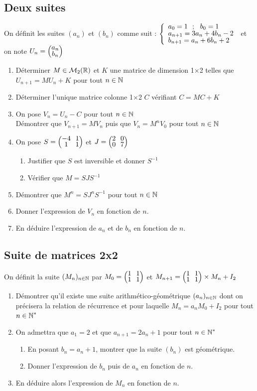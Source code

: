 \documentclass[oneside,12pt]{book}          %
\begin{document}
\subsection{Deux suites}
On définit les suites $(a_n)$ et $(b_n)$ comme suit : $\accol{a_0=1 ~~ ; ~~ b_0=1\\a_{n+1}=3a_n+4b_n-2\\b_{n+1}=a_n+6b_n+2}$ et on note $U_n=\matrice{a_n\\b_n}$

\begin{enumerate}
	\item Déterminer $M\in\mathcal{M}_2({\mathbb R})$ et $K$ une matrice de dimension 1$\times$2 telles que $U_{n+1}=MU_n+K$ pour tout ${n\in\mathbb N}$
	\item Déterminer l'unique matrice colonne 1$\times$2 $C$ vérifiant $C=MC+K$
	\item On pose $V_n=U_n-C$ pour tout ${n\in\mathbb N}$\\
	Démontrer que $V_{n+1}=MV_n$ puis que $V_n=M^nV_0$ pour tout ${n\in\mathbb N}$
	\item On pose $S=\matrice{-4&1\\1&1}$ et $J=\matrice{2&0\\0&7}$
	\begin{enumerate}
		\item Justifier que $S$ est inversible et donner $S^{-1}$
		\item Vérifier que $M=SJS^{-1}$
	\end{enumerate}
	\item Démontrer que $M^n=SJ^nS^{-1}$ pour tout ${n\in\mathbb N}$
	\item Donner l'expression de $V_n$ en fonction de $n$.
	\item En déduire l'expression de $a_n$ et de $b_n$ en fonction de $n$.
\end{enumerate}



\subsection{Suite de matrices 2x2}
On définit la suite $(M_n)_{n\in\mathbb N}$ par $M_0=\matrice{1&1\\1&1}$ et $M_{n+1}=\matrice{1&1\\1&1}\times M_n +I_2$

\begin{enumerate}
	\item Démontrer qu'il existe une suite arithmético-géométrique $(a_n)_{n\in\mathbb N}$ dont on précisera la relation de récurrence et pour laquelle $M_n=a_nM_0+I_2$ pour tout ${n\in\mathbb N}^*$
	\item On admettra que $a_1=2$ et que $a_{n+1}=2a_n+1$ pour tout ${n\in\mathbb N}^*$
	\begin{enumerate}
		\item En posant $b_n=a_n+1$, montrer que la suite $(b_n)$ est géométrique.
		\item Donner l'expression de $b_n$ puis de $a_n$ en fonction de $n$.
	\end{enumerate}
	\item En déduire alors l'expression de $M_n$ en fonction de $n$.
\end{enumerate}
\end{document}
